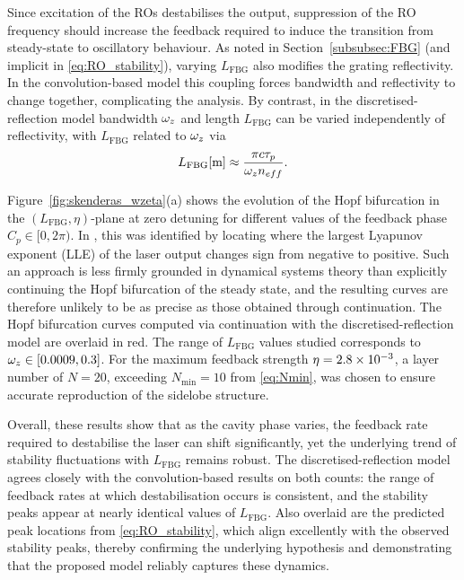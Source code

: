 Since excitation of the ROs destabilises the output, suppression of the RO frequency should increase the feedback required to induce the transition from steady-state to oscillatory behaviour. 
As noted in Section~\ref{subsubsec:FBG} (and implicit in \eqref{eq:RO_stability}), varying $L_\text{FBG}$ also modifies the grating reflectivity. 
In the convolution-based model this coupling forces bandwidth and reflectivity to change together, complicating the analysis. 
By contrast, in the discretised-reflection model bandwidth $\omega_z$ and length $L_\text{FBG}$ can be varied independently of reflectivity, with $L_\text{FBG}$ related to $\omega_z$ via
%
\begin{equation}
    L_\text{FBG} [\text{m}] \approx \frac{\pi c \tau_p}{\omega_z n_{eff}}.
\end{equation}
%
\par
%
Figure~\ref{fig:skenderas_wzeta}(a) shows the evolution of the Hopf bifurcation in the $(L_\text{FBG},\eta)$-plane at zero detuning for different values of the feedback phase $C_p \in [0, 2\pi)$. 
In \cite{skenderas2024impact}, this was identified by locating where the largest Lyapunov exponent (LLE) of the laser output changes sign from negative to positive. 
Such an approach is less firmly grounded in dynamical systems theory than explicitly continuing the Hopf bifurcation of the steady state, and the resulting curves are therefore unlikely to be as precise as those obtained through continuation. 
The Hopf bifurcation curves computed via continuation with the discretised-reflection model are overlaid in red. 
The range of $L_\text{FBG}$ values studied corresponds to $\omega_z \in [0.0009, 0.3]$. 
For the maximum feedback strength $\eta = 2.8\times 10^{-3}$, a layer number of $N = 20$, exceeding $N_\text{min} = 10$ from \eqref{eq:Nmin}, was chosen to ensure accurate reproduction of the sidelobe structure. 
%
\par
%
Overall, these results show that as the cavity phase varies, the feedback rate required to destabilise the laser can shift significantly, yet the underlying trend of stability fluctuations with $L_\text{FBG}$ remains robust. 
The discretised-reflection model agrees closely with the convolution-based results on both counts: the range of feedback rates at which destabilisation occurs is consistent, and the stability peaks appear at nearly identical values of $L_\text{FBG}$. 
Also overlaid are the predicted peak locations from \eqref{eq:RO_stability}, which align excellently with the observed stability peaks, thereby confirming the underlying hypothesis and demonstrating that the proposed model reliably captures these dynamics. 
